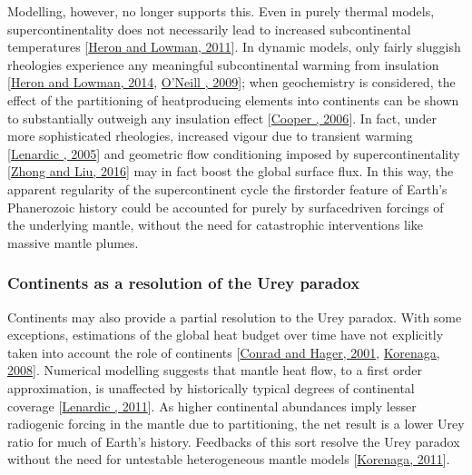 \documentclass[letterpaper,10pt,english]{jupyterBook}
\begin{document}
\sphinxAtStartPar
Modelling, however, no longer supports this. Even in purely thermal models, supercontinentality does not necessarily lead to increased sub\sphinxhyphen{}continental temperatures {[}\hyperlink{cite.references:id523}{Heron and Lowman, 2011}{]}. In dynamic models, only fairly sluggish rheologies experience any meaningful sub\sphinxhyphen{}continental warming from insulation {[}\hyperlink{cite.references:id527}{Heron and Lowman, 2014}, \hyperlink{cite.references:id529}{O'Neill , 2009}{]}; when geochemistry is considered, the effect of the partitioning of heat\sphinxhyphen{}producing elements into continents can be shown to substantially outweigh any insulation effect {[}\hyperlink{cite.references:id524}{Cooper , 2006}{]}. In fact, under more sophisticated rheologies, increased vigour due to transient warming {[}\hyperlink{cite.references:id90}{Lenardic , 2005}{]} and geometric flow conditioning imposed by supercontinentality {[}\hyperlink{cite.references:id329}{Zhong and Liu, 2016}{]} may in fact boost the global surface flux. In this way, the apparent regularity of the supercontinent cycle \sphinxhyphen{} the first\sphinxhyphen{}order feature of Earth’s Phanerozoic history \sphinxhyphen{} could be accounted for purely by surface\sphinxhyphen{}driven forcings of the underlying mantle, without the need for catastrophic interventions like massive mantle plumes.


\subsubsection{Continents as a resolution of the Urey paradox}
\label{\detokenize{content/chapter_01_background/main:continents-as-a-resolution-of-the-urey-paradox}}
\sphinxAtStartPar
Continents may also provide a partial resolution to the Urey paradox. With some exceptions, estimations of the global heat budget over time have not explicitly taken into account the role of continents {[}\hyperlink{cite.references:id531}{Conrad and Hager, 2001}, \hyperlink{cite.references:id472}{Korenaga, 2008}{]}. Numerical modelling suggests that mantle heat flow, to a first order approximation, is unaffected by historically typical degrees of continental coverage {[}\hyperlink{cite.references:id366}{Lenardic , 2011}{]}. As higher continental abundances imply lesser radiogenic forcing in the mantle due to partitioning, the net result is a lower Urey ratio for much of Earth’s history. Feedbacks of this sort resolve the Urey paradox without the need for untestable heterogeneous mantle models {[}\hyperlink{cite.references:id364}{Korenaga, 2011}{]}.
\end{document}
